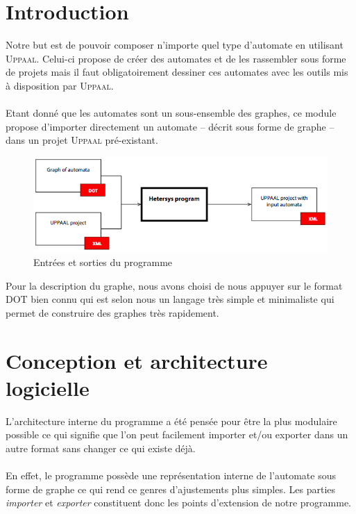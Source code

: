 \documentclass[12pt,a4paper]{report}
\begin{document}
\section{Introduction}

Notre but est de pouvoir composer n'importe quel type d'automate en utilisant 
\textsc{Uppaal}. Celui-ci propose de créer des automates et de les rassembler sous forme de projets 
mais il faut obligatoirement dessiner ces automates avec les outils mis à disposition
par \textsc{Uppaal}.
\\\\
Etant donné que les automates sont un sous-ensemble des graphes, ce module propose 
d'importer directement un automate -- décrit sous forme de graphe -- dans un projet 
\textsc{Uppaal} pré-existant. 

\begin{figure}[h]
  \centering
  \includegraphics[scale=0.7]{ressources/ProgramScheme.png}
  \caption{Entrées et sorties du programme}
\end{figure}

Pour la description du graphe, nous avons choisi de nous appuyer
sur le format DOT bien connu qui est selon nous un langage très simple et minimaliste 
qui permet de construire des graphes très rapidement.

\section{Conception et architecture logicielle}

L'architecture interne du programme a été pensée pour être la plus modulaire possible 
ce qui signifie que l'on peut facilement importer et/ou exporter dans un autre format
sans changer ce qui existe déjà. 
\\\\
En effet, le programme possède une représentation interne de l'automate sous forme 
de graphe ce qui rend ce genres d'ajustements plus simples. Les parties \emph{importer}
et \emph{exporter} constituent donc les points d'extension de notre programme.
\end{document}
